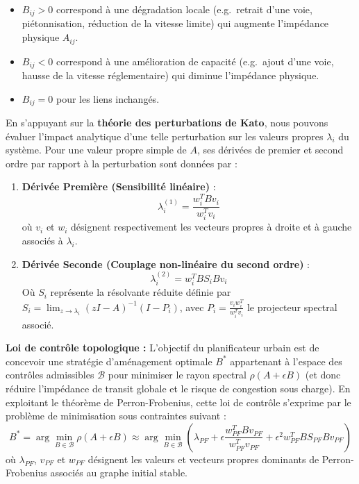 \documentclass[10pt, a4paper]{article}
\providecommand{\tightlist}{}
\begin{document}
\begin{itemize}
\tightlist
\item
  \(B_{ij} > 0\) correspond à une dégradation locale (e.g.~retrait d'une
  voie, piétonnisation, réduction de la vitesse limite) qui augmente
  l'impédance physique \(A_{ij}\).
\item
  \(B_{ij} < 0\) correspond à une amélioration de capacité (e.g.~ajout
  d'une voie, hausse de la vitesse réglementaire) qui diminue
  l'impédance physique.
\item
  \(B_{ij} = 0\) pour les liens inchangés.
\end{itemize}

En s'appuyant sur la \textbf{théorie des perturbations de Kato}, nous
pouvons évaluer l'impact analytique d'une telle perturbation sur les
valeurs propres \(\lambda_i\) du système. Pour une valeur propre simple
de \(A\), ses dérivées de premier et second ordre par rapport à la
perturbation sont données par :

\begin{enumerate}
\def\labelenumi{\arabic{enumi}.}
\item
  \textbf{Dérivée Première (Sensibilité linéaire)} :
  \[\lambda_i^{(1)} = \frac{w_i^T B v_i}{w_i^T v_i}\] où \(v_i\) et
  \(w_i\) désignent respectivement les vecteurs propres à droite et à
  gauche associés à \(\lambda_i\).
\item
  \textbf{Dérivée Seconde (Couplage non-linéaire du second ordre)} :
  \[\lambda_i^{(2)} = w_i^T B S_i B v_i\] Où \(S_i\) représente la
  résolvante réduite définie par
  \(S_i = \lim_{z \to \lambda_i} (zI - A)^{-1}(I - P_i)\), avec
  \(P_i = \frac{v_i w_i^T}{w_i^T v_i}\) le projecteur spectral associé.
\end{enumerate}

\textbf{Loi de contrôle topologique :} L'objectif du planificateur
urbain est de concevoir une stratégie d'aménagement optimale \(B^*\)
appartenant à l'espace des contrôles admissibles \(\mathcal{B}\) pour
minimiser le rayon spectral \(\rho(A + \epsilon B)\) (et donc réduire
l'impédance de transit globale et le risque de congestion sous charge).
En exploitant le théorème de Perron-Frobenius, cette loi de contrôle
s'exprime par le problème de minimisation sous contraintes suivant :
\[B^* = \arg\min_{B \in \mathcal{B}} \rho(A + \epsilon B) \approx \arg\min_{B \in \mathcal{B}} \left( \lambda_{PF} + \epsilon \frac{w_{PF}^T B v_{PF}}{w_{PF}^T v_{PF}} + \epsilon^2 w_{PF}^T B S_{PF} B v_{PF} \right)\]
où \(\lambda_{PF}\), \(v_{PF}\) et \(w_{PF}\) désignent les valeurs et
vecteurs propres dominants de Perron-Frobenius associés au graphe
initial stable.
\end{document}
